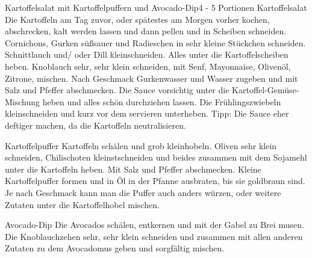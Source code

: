 \documentclass[a4paper,10pt]{article}
\begin{document}
    \begin{recipe}{Kartoffelsalat mit Kartoffelpuffern und Avocado-Dip}{4 - 5 
    Portionen}{}
      \freeform Kartoffelsalat
      Die Kartoffeln am Tag zuvor, oder spätestes am Morgen vorher kochen, abschrecken, kalt 
      werden lassen und dann pellen und in Scheiben schneiden.
      Cornichons, Gurken süßsauer und Radieschen in sehr kleine Stückchen schneiden. 
      Schnittlauch und/ oder Dill kleinschneiden. Alles unter die Kartoffelscheiben heben.
      Knoblauch sehr, sehr klein schneiden, mit Senf, Mayonnaise, Olivenöl, Zitrone, mischen.
      Nach Geschmack Gurkenwasser und Wasser zugeben und mit Salz und Pfeffer abschmecken. 
      Die Sauce vorsichtig unter die Kartoffel-Gemüse-Mischung heben und alles schön durchziehen lassen.
      Die Frühlingszwiebeln kleinschneiden und kurz vor dem servieren unterheben.
      \freeform Tipp: Die Sauce eher deftiger machen, da die Kartoffeln neutralisieren.
      
      \freeform Kartoffelpuffer
      Kartoffeln schälen und grob kleinhobeln.
      Oliven sehr klein schneiden, Chilischoten kleinstschneiden und beides zusammen mit dem Sojamehl 
      unter die Kartoffeln heben. Mit Salz und Pfeffer abschmecken. Kleine Kartoffelpuffer formen und
      in Öl in der Pfanne ausbraten, bis sie goldbraun sind. 
      \freeform Je nach Geschmack kann man die Puffer auch anders würzen, oder weitere Zutaten unter 
      die Kartoffelhobel mischen. 
      
      \freeform Avocado-Dip 
      Die Avocados schälen, entkernen und mit der Gabel zu Brei musen.
      Die Knoblauchzehen sehr, sehr klein schneiden und zusammen mit allen anderen Zutaten zu dem 
      Avocadomus geben und sorgfältig mischen. 
    \end{recipe}
    
\end{document}
